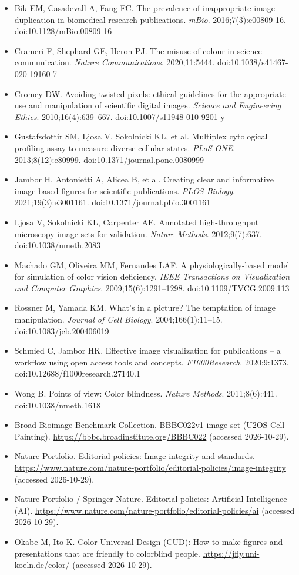 \begin{itemize}\sloppy
\item Bik EM, Casadevall A, Fang FC. The prevalence of inappropriate image duplication in biomedical research publications. \emph{mBio}. 2016;7(3):e00809-16. doi:10.1128/mBio.00809-16
\item Crameri F, Shephard GE, Heron PJ. The misuse of colour in science communication. \emph{Nature Communications}. 2020;11:5444. doi:10.1038/s41467-020-19160-7
\item Cromey DW. Avoiding twisted pixels: ethical guidelines for the appropriate use and manipulation of scientific digital images. \emph{Science and Engineering Ethics}. 2010;16(4):639--667. doi:10.1007/s11948-010-9201-y
\item Gustafsdottir SM, Ljosa V, Sokolnicki KL, et al. Multiplex cytological profiling assay to measure diverse cellular states. \emph{PLoS ONE}. 2013;8(12):e80999. doi:10.1371/journal.pone.0080999
\item Jambor H, Antonietti A, Alicea B, et al. Creating clear and informative image-based figures for scientific publications. \emph{PLOS Biology}. 2021;19(3):e3001161. doi:10.1371/journal.pbio.3001161
\item Ljosa V, Sokolnicki KL, Carpenter AE. Annotated high-throughput microscopy image sets for validation. \emph{Nature Methods}. 2012;9(7):637. doi:10.1038/nmeth.2083
\item Machado GM, Oliveira MM, Fernandes LAF. A physiologically-based model for simulation of color vision deficiency. \emph{IEEE Transactions on Visualization and Computer Graphics}. 2009;15(6):1291--1298. doi:10.1109/TVCG.2009.113
\item Rossner M, Yamada KM. What's in a picture? The temptation of image manipulation. \emph{Journal of Cell Biology}. 2004;166(1):11--15. doi:10.1083/jcb.200406019
\item Schmied C, Jambor HK. Effective image visualization for publications -- a workflow using open access tools and concepts. \emph{F1000Research}. 2020;9:1373. doi:10.12688/f1000research.27140.1
\item Wong B. Points of view: Color blindness. \emph{Nature Methods}. 2011;8(6):441. doi:10.1038/nmeth.1618
\item Broad Bioimage Benchmark Collection. BBBC022v1 image set (U2OS Cell Painting). \url{https://bbbc.broadinstitute.org/BBBC022} (accessed 2026-10-29).
\item Nature Portfolio. Editorial policies: Image integrity and standards. \url{https://www.nature.com/nature-portfolio/editorial-policies/image-integrity} (accessed 2026-10-29).
\item Nature Portfolio / Springer Nature. Editorial policies: Artificial Intelligence (AI). \url{https://www.nature.com/nature-portfolio/editorial-policies/ai} (accessed 2026-10-29).
\item Okabe M, Ito K. Color Universal Design (CUD): How to make figures and presentations that are friendly to colorblind people. \url{https://jfly.uni-koeln.de/color/} (accessed 2026-10-29).
\end{itemize}
